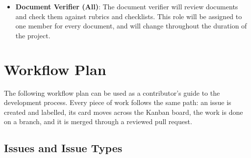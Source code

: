\documentclass{article}
\begin{document}
\begin{itemize}
  \begin{itemize}
    \item \textbf{Frontend and UX Lead (Keira)}: Build the web application and wallet integration for submitting requests, authorizing transactions, and viewing results. Lead the cognitive walkthrough and usability testing.
    \item \textbf{Backend Provider SDK Lead (Aidan)}: Build the inference provider client that listens for requests, runs models, and submits predictions. Develop the simulated providers.
    \item \textbf{Smart Contract and Blackchain Lead (Robert)}: Design and implement the marketplace smart contracts for task definitions, inference requests, provider registration, payments, and settlement. Manage deployment to the test network and on-chain record. 
    \item \textbf{Aggregation and Reputation Lead (Nathan)}: Design and implement the prediction aggregation algorithm and the provider reputation and reward mechanisms. 
    \item \textbf{Test Lead (All)}: The test developer will be in charge of writing tests for components of the system. Components will be assigned to all members of the team to ensure testing covers all part of the system.
  \end{itemize}

  \item \textbf{Document Verifier (All)}: The document verifier will review documents and check them against rubrics and checklists. This role will be assigned to one member for every document, and will change throughout the duration of the project.
  
\end{itemize}

\section{Workflow Plan} \label{sec:workflow}
The following workflow plan can be used as a contributor's guide to the development process. Every piece of work follows the same path: an issue is created and labelled, its card moves across the Kanban board, the work is done on a branch, and it is merged through a reviewed pull request.

\subsection{Issues and Issue Types}
\end{document}
